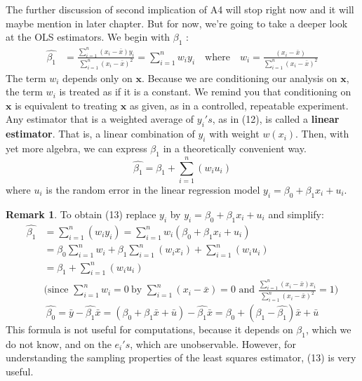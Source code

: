 \documentclass[a4paper, 10pt]{article}
\theoremstyle{definition}	%
\newtheorem*{remark}{Remark}
\begin{document}
The further discussion of second implication of A4 will stop right now and it will maybe mention in later chapter. But for now, we're going to take a deeper look at the OLS estimators. We begin with $\beta_1$ :
\begin{align}
    \hat{\beta_1} &= \frac{\sum_{i=1}^{n}\left(x_i - \bar{x}\right) y_i}{\sum_{i=1}^{n} \left(x_i - \bar{x}\right)^2} = 
    \sum_{i=1}^{n}w_i y_i \quad \text{where} \quad
    w_i = \frac{\left(x_i - \bar{x}\right)}{\sum_{i=1}^{n} \left(x_i - \bar{x}\right)^2}
\end{align}
The term $w_i$ depends only on $\textbf{x}$. Because we are conditioning our analysis on $\textbf{x}$, the term $w_i$ is treated as if it is a constant. We remind you that conditioning on $\textbf{x}$ is equivalent to treating $\textbf{x}$ as given, as in a controlled, repeatable experiment.\\
Any estimator that is a weighted average of $y_i's$, as in (12), is called a \textbf{linear estimator}. That is, a linear combination of $y_i$ with weight $w(x_i)$. Then, with yet more algebra, we can express $\beta_1$ in a theoretically convenient way. 
\begin{equation}
    \hat{\beta_1} = \beta_1 + \sum_{i=1}^{n}(w_i u_i) 
\end{equation}
where $u_i$ is the random error in the linear regression model $y_i = \beta_0 + \beta_1 x_i + u_i$.
\begin{remark}
    To obtain (13) replace $y_i$ by $y_i = \beta_0 + \beta_1 x_i + u_i$ and simplify:
    \begin{align*}
        \hat{\beta_1} &= \sum_{i=1}^{n}(w_i y_i) = \sum_{i=1}^{n}w_i(\beta_0 + \beta_1 x_i + u_i)\\
        &= \beta_0\sum_{i=1}^{n}w_i +  \beta_1\sum_{i=1}^{n}(w_i x_i) + \sum_{i=1}^{n}(w_i u_i)\\
        &= \beta_1 + \sum_{i=1}^{n}(w_i u_i)\\
        & \text{(since $\sum_{i=1}^{n}w_i = 0$}\ \text{by $\sum_{i=1}^{n}\left(x_i - \bar{x}\right) = 0$ and $\frac{\sum_{i=1}^{n}\left(x_i - \bar{x}\right)x_i}{\sum_{i=1}^{n} \left(x_i - \bar{x}\right)^2} = 1$)}
        \end{align*}
    \begin{equation}
        \hat{\beta_0} = \bar{y} - \hat{\beta_1}\bar{x} = (\beta_0 + \beta_1\bar{x} + \bar{u}) - \hat{\beta_1}\bar{x} = \beta_0 + (\beta_1 - \hat{\beta_1})\bar{x} + \bar{u}   
    \end{equation}    
This formula is not useful for computations, because it depends on $\beta_1$, which we do not know, and on the $e_i's$, which are unobservable. However, for understanding the sampling properties of the least squares estimator, (13) is very useful. 
\end{remark}
\end{document}
